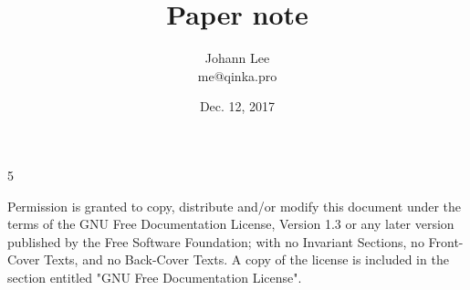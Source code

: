 \documentclass{blog}
\title{Paper note}
\author{Johann Lee \\ me@qinka.pro}
\date{Dec. 12, 2017}
\begin{document}
5
    \maketitle
    \begin{license}
        
        \par Permission is granted to copy, distribute and/or modify this document
        under the terms of the GNU Free Documentation License, Version 1.3
        or any later version published by the Free Software Foundation;
        with no Invariant Sections, no Front-Cover Texts, and no Back-Cover Texts.
        A copy of the license is included in the section entitled "GNU
        Free Documentation License".
    \end{license}
\end{document}
